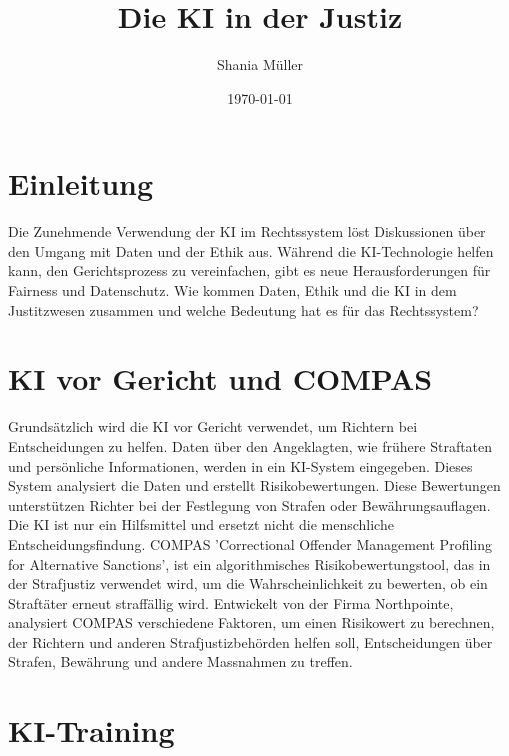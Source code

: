 \documentclass{article}
\title{Die KI in der Justiz}
\author{Shania Müller}
\date{\today}
\begin{document}
\maketitle


\tableofcontents


\newpage
\section {Einleitung}
 
Die Zunehmende Verwendung der KI im Rechtssystem löst Diskussionen über den 
Umgang mit Daten und der Ethik aus. Während die KI-Technologie helfen kann, den
Gerichtsprozess zu vereinfachen, gibt es neue Herausforderungen für Fairness und Datenschutz.
Wie kommen Daten, Ethik und die KI in dem Justitzwesen
zusammen und welche Bedeutung hat es für das Rechtssystem? 


\section {KI vor Gericht und COMPAS}

Grundsätzlich wird die KI vor Gericht verwendet, um Richtern bei Entscheidungen zu helfen. 
Daten über den Angeklagten, wie frühere Straftaten und persönliche Informationen, werden in ein 
KI-System eingegeben. Dieses System analysiert die Daten und erstellt Risikobewertungen.
Diese Bewertungen unterstützen Richter bei der Festlegung von Strafen oder Bewährungsauflagen. 
Die KI ist nur ein Hilfsmittel und ersetzt nicht die menschliche Entscheidungsfindung.
\newline COMPAS 'Correctional Offender Management Profiling for Alternative Sanctions', ist ein 
algorithmisches Risikobewertungstool, das in der Strafjustiz verwendet wird, um die 
Wahrscheinlichkeit zu bewerten, ob ein Straftäter erneut straffällig wird.
Entwickelt von der Firma Northpointe, analysiert COMPAS verschiedene Faktoren, um 
einen Risikowert zu berechnen, der Richtern und anderen 
Strafjustizbehörden helfen soll, Entscheidungen über Strafen, Bewährung und andere 
Massnahmen zu treffen.  



\section {KI-Training}
\end{document}
